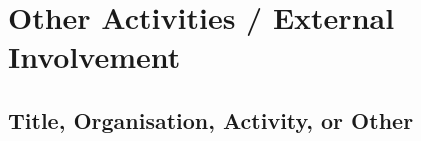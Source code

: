 \documentclass[letterpaper]{leene-resume} %
\begin{document}
{\sectionspace

\section{Other Activities / External Involvement}

\subsection{Title, Organisation, Activity, or Other}
\lipsum[4]
}
\end{document}
